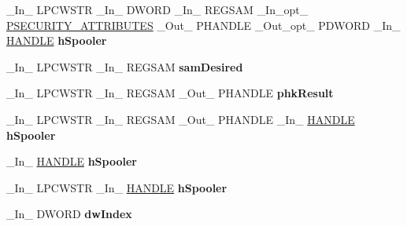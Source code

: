 \begin{DoxyCompactItemize}
\item 
\mbox{\label{struct___m_o_n_i_t_o_r_r_e_g_a4359cb3f94d838faa4c56e99edf2259b}} 
\+\_\+\+In\+\_\+ L\+P\+C\+W\+S\+TR \+\_\+\+In\+\_\+ D\+W\+O\+RD \+\_\+\+In\+\_\+ R\+E\+G\+S\+AM \+\_\+\+In\+\_\+opt\+\_\+ \hyperlink{struct___s_e_c_u_r_i_t_y___a_t_t_r_i_b_u_t_e_s}{P\+S\+E\+C\+U\+R\+I\+T\+Y\+\_\+\+A\+T\+T\+R\+I\+B\+U\+T\+ES} \+\_\+\+Out\+\_\+ P\+H\+A\+N\+D\+LE \+\_\+\+Out\+\_\+opt\+\_\+ P\+D\+W\+O\+RD \+\_\+\+In\+\_\+ \hyperlink{interfacevoid}{H\+A\+N\+D\+LE} {\bfseries h\+Spooler}
\item 
\mbox{\label{struct___m_o_n_i_t_o_r_r_e_g_aad9aaf2db087a9ba13ab1b057247dbf5}} 
\+\_\+\+In\+\_\+ L\+P\+C\+W\+S\+TR \+\_\+\+In\+\_\+ R\+E\+G\+S\+AM {\bfseries sam\+Desired}
\item 
\mbox{\label{struct___m_o_n_i_t_o_r_r_e_g_a6c9433f5d31b3b6464a8e7f6d5e300b5}} 
\+\_\+\+In\+\_\+ L\+P\+C\+W\+S\+TR \+\_\+\+In\+\_\+ R\+E\+G\+S\+AM \+\_\+\+Out\+\_\+ P\+H\+A\+N\+D\+LE {\bfseries phk\+Result}
\item 
\mbox{\label{struct___m_o_n_i_t_o_r_r_e_g_a6b24b828caeed3a05e09115aa09d38e0}} 
\+\_\+\+In\+\_\+ L\+P\+C\+W\+S\+TR \+\_\+\+In\+\_\+ R\+E\+G\+S\+AM \+\_\+\+Out\+\_\+ P\+H\+A\+N\+D\+LE \+\_\+\+In\+\_\+ \hyperlink{interfacevoid}{H\+A\+N\+D\+LE} {\bfseries h\+Spooler}
\item 
\mbox{\label{struct___m_o_n_i_t_o_r_r_e_g_ade766c21648d0e17875fca5780c92c3b}} 
\+\_\+\+In\+\_\+ \hyperlink{interfacevoid}{H\+A\+N\+D\+LE} {\bfseries h\+Spooler}
\item 
\mbox{\label{struct___m_o_n_i_t_o_r_r_e_g_a4359cb3f94d838faa4c56e99edf2259b}} 
\+\_\+\+In\+\_\+ L\+P\+C\+W\+S\+TR \+\_\+\+In\+\_\+ \hyperlink{interfacevoid}{H\+A\+N\+D\+LE} {\bfseries h\+Spooler}
\item 
\mbox{\label{struct___m_o_n_i_t_o_r_r_e_g_a91b3a2d714494fc9d98c9e067c22d6ef}} 
\+\_\+\+In\+\_\+ D\+W\+O\+RD {\bfseries dw\+Index}
\item 
\mbox{\label{struct___m_o_n_i_t_o_r_r_e_g_a11860d2974dcdfb3c87d98959cdf749d}} 

\end{DoxyCompactItemize}
